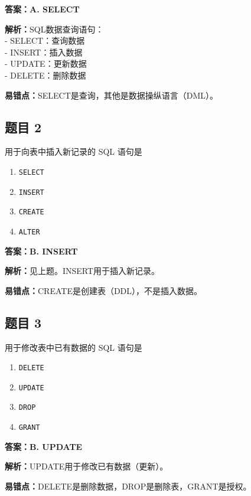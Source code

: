 \documentclass[12pt,a4paper]{ctexart}
\begin{document}
\begin{answerbox}
	\textbf{答案：A. SELECT}

	\textbf{解析：}SQL数据查询语句：\\
	- SELECT：查询数据\\
	- INSERT：插入数据\\
	- UPDATE：更新数据\\
	- DELETE：删除数据

	\textbf{易错点：}SELECT是查询，其他是数据操纵语言（DML）。
\end{answerbox}

\subsection*{题目 2}
用于向表中插入新记录的 SQL 语句是
\begin{enumerate}[label=\Alph*.]
	\item \texttt{SELECT}
	\item \texttt{INSERT}
	\item \texttt{CREATE}
	\item \texttt{ALTER}
\end{enumerate}

\begin{answerbox}
	\textbf{答案：B. INSERT}

	\textbf{解析：}见上题。INSERT用于插入新记录。

	\textbf{易错点：}CREATE是创建表（DDL），不是插入数据。
\end{answerbox}

\subsection*{题目 3}
用于修改表中已有数据的 SQL 语句是
\begin{enumerate}[label=\Alph*.]
	\item \texttt{DELETE}
	\item \texttt{UPDATE}
	\item \texttt{DROP}
	\item \texttt{GRANT}
\end{enumerate}

\begin{answerbox}
	\textbf{答案：B. UPDATE}

	\textbf{解析：}UPDATE用于修改已有数据（更新）。

	\textbf{易错点：}DELETE是删除数据，DROP是删除表，GRANT是授权。
\end{answerbox}
\end{document}
